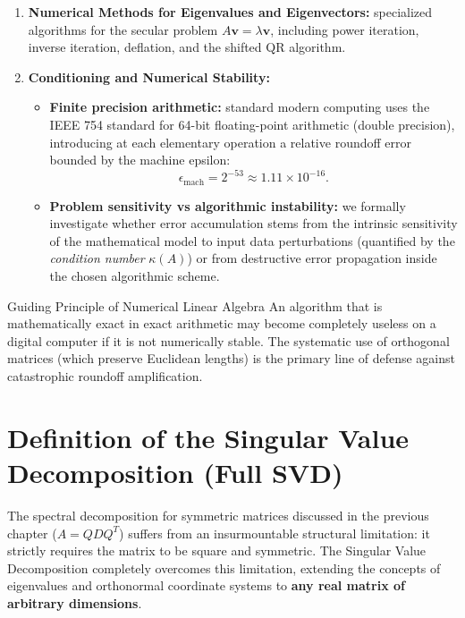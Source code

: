 \begin{enumerate}
    \item \textbf{Numerical Methods for Eigenvalues and Eigenvectors:} specialized algorithms for the secular problem $A\mathbf{v} = \lambda \mathbf{v}$, including power iteration, inverse iteration, deflation, and the shifted QR algorithm.

    \item \textbf{Conditioning and Numerical Stability:}
    \begin{itemize}
        \item \textbf{Finite precision arithmetic:} standard modern computing uses the IEEE 754 standard for 64-bit floating-point arithmetic (double precision), introducing at each elementary operation a relative roundoff error bounded by the machine epsilon:
        \begin{equation}
            \epsilon_{\text{mach}} = 2^{-53} \approx 1.11 \times 10^{-16}.
        \end{equation}
        \item \textbf{Problem sensitivity vs algorithmic instability:} we formally investigate whether error accumulation stems from the intrinsic sensitivity of the mathematical model to input data perturbations (quantified by the \textit{condition number} $\kappa(A)$) or from destructive error propagation inside the chosen algorithmic scheme.
    \end{itemize}
\end{enumerate}

\begin{alertblock}{Guiding Principle of Numerical Linear Algebra}
An algorithm that is mathematically exact in exact arithmetic may become completely useless on a digital computer if it is not numerically stable. The systematic use of orthogonal matrices (which preserve Euclidean lengths) is the primary line of defense against catastrophic roundoff amplification.
\end{alertblock}

\FloatBarrier
\section{Definition of the Singular Value Decomposition (Full SVD)}
\label{sec:svd-definition-full-en}

The spectral decomposition for symmetric matrices discussed in the previous chapter ($A = QDQ^T$) suffers from an insurmountable structural limitation: it strictly requires the matrix to be square and symmetric. The Singular Value Decomposition completely overcomes this limitation, extending the concepts of eigenvalues and orthonormal coordinate systems to \textbf{any real matrix of arbitrary dimensions}.

